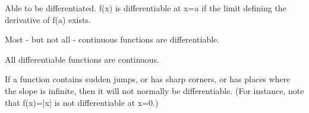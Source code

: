 Able to be differentiated. f(x) is differentiable at x=a if the limit
defining the derivative of f(a) exists.
\par
Most - but not all - continuous functions are differentiable.
\par
All differentiable functions are continuous.
\par
If a function contains sudden jumps, or has sharp corners,
or has places where the slope is infinite, then it will
not normally be differentiable. 
(For instance, note that f(x)=|x| is not differentiable at x=0.)